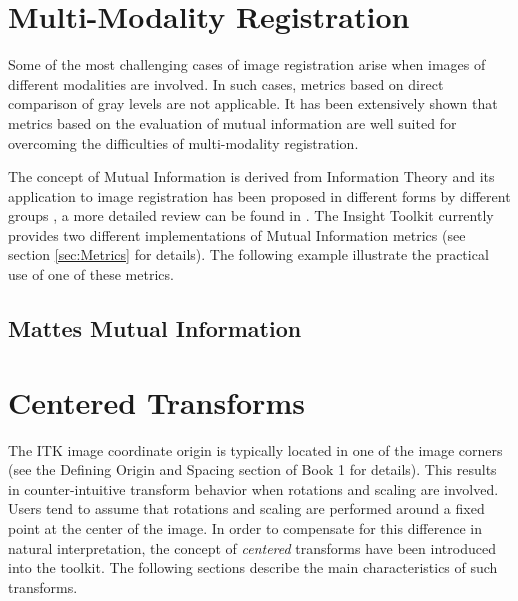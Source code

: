 \section{Multi-Modality Registration}
\label{sec:MultiModalityRegistration}

Some of the most challenging cases of image registration arise when images of
different modalities are involved. In such cases, metrics based on direct
comparison of gray levels are not applicable. It has been extensively shown
that metrics based on the evaluation of mutual information are well suited for
overcoming the difficulties of multi-modality registration.


The concept of Mutual Information is derived from Information Theory and its
application to image registration has been proposed in different forms by
different groups \cite{Collignon1995,Maes97,Viola1997}, a more detailed review
can be found in \cite{Hajnal2001,Pluim2003}. The Insight Toolkit currently
provides two different implementations of Mutual Information metrics (see
section \ref{sec:Metrics} for details). The following example illustrate the
practical use of one of these metrics.

\subsection{Mattes Mutual Information}
\label{sec:MultiModalityRegistrationMattes}
\ifitkFullVersion

\fi

% 


\section{ Centered Transforms }

The ITK image coordinate origin is typically located in one of the image
corners (see the  Defining Origin and Spacing section of Book 1 for details).
This results in counter-intuitive transform behavior when rotations and scaling
are involved. Users tend to assume that rotations and scaling are performed
around a fixed point at the center of the image.  In order to compensate for
this difference in natural interpretation, the concept of \emph{centered}
transforms have been introduced into the toolkit. The following sections
describe the main characteristics of such transforms.

